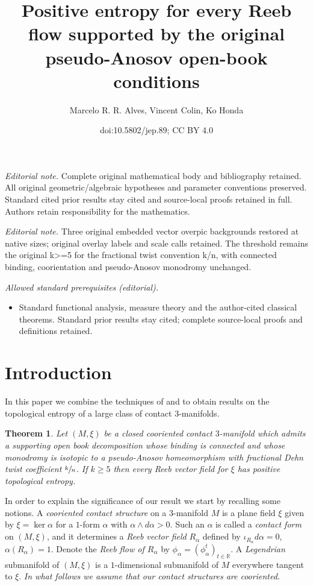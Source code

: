 \documentclass[10pt]{amsart}
\title{Positive entropy for every Reeb flow supported by the original pseudo-Anosov open-book conditions}
\author{Marcelo R. R. Alves, Vincent Colin, Ko Honda}
\date{doi:10.5802/jep.89; CC BY 4.0}
\theoremstyle{plain}
\newtheorem{thm}{Theorem}[section]
\theoremstyle{definition}
\numberwithin{equation}{subsection}
\newcommand{\RR}{\mathbb{R}}
\providecommand{\mainmatter}{}\providecommand{\backmatter}{}
\begin{document}
\maketitle
\noindent\textit{Editorial note.} Complete original mathematical body and bibliography retained. All original geometric/algebraic hypotheses and parameter conventions preserved. Standard cited prior results stay cited and source-local proofs retained in full. Authors retain responsibility for the mathematics.\par\medskip
\noindent\textit{Editorial note.} Three original embedded vector overpic backgrounds restored at native sizes; original overlay labels and scale calls retained. The threshold remains the original k>=5 for the fractional twist convention k/n, with connected binding, coorientation and pseudo-Anosov monodromy unchanged.\par\medskip
\noindent\textit{Allowed standard prerequisites (editorial).}\begin{itemize}
\item Standard functional analysis, measure theory and the author-cited classical theorems. Standard prior results stay cited; complete source-local proofs and definitions retained.
\end{itemize}\medskip
\tableofcontents
\mainmatter

\section{Introduction}

In this paper we combine the techniques of \cite{CH2} and \cite{Al} to obtain results on the topological entropy of a large class of contact $3$-manifolds.


\begin{thm}\label{thm: main}
Let $(M,\xi)$ be a closed cooriented contact $3$-manifold which admits a supporting open book decomposition whose binding is connected and whose monodromy is isotopic to a pseudo-Anosov homeomorphism with fractional Dehn twist coefficient $\sfrac{k}{n}$. If $k \geq 5$ then every Reeb vector field for $\xi$ has positive topological entropy.
\end{thm}


In order to explain the significance of our result we start by recalling some notions. A \textit{cooriented contact structure} on a $3$-manifold $M$ is a plane field $\xi$ given by $\xi = \ker \alpha$ for a $1$-form $\alpha$ with $\alpha \wedge d\alpha > 0$. Such an $\alpha$ is called a \textit{contact form} on $(M,\xi)$, and it determines a \textit{Reeb vector field} $R_{\alpha}$ defined by $\iota_{R_{\alpha}}d\alpha = 0$, $\alpha(R_{\alpha})= 1$. Denote the \textit{Reeb flow of $R_\alpha$} by $\phi_{\alpha}= (\phi_{\alpha}^t)_{t\in \RR}$. A \textit{Legendrian} submanifold of $(M,\xi)$ is a $1$-dimensional submanifold of $M$ everywhere tangent to $\xi$. {\em In what follows we assume that our contact structures are cooriented.}
\end{document}
